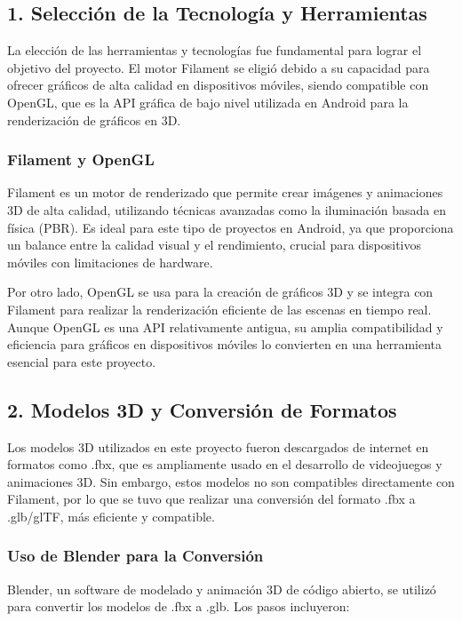 \documentclass[conference]{IEEEtran}
\begin{document}
\subsection{1. Selección de la Tecnología y Herramientas}

La elección de las herramientas y tecnologías fue fundamental para lograr el objetivo del proyecto. El motor Filament \cite{filamentGraphics} se eligió debido a su capacidad para ofrecer gráficos de alta calidad en dispositivos móviles, siendo compatible con OpenGL, que es la API gráfica de bajo nivel utilizada en Android para la renderización de gráficos en 3D.

\subsubsection{Filament y OpenGL}

Filament es un motor de renderizado que permite crear imágenes y animaciones 3D de alta calidad, utilizando técnicas avanzadas como la iluminación basada en física (PBR). Es ideal para este tipo de proyectos en Android, ya que proporciona un balance entre la calidad visual y el rendimiento, crucial para dispositivos móviles con limitaciones de hardware.

Por otro lado, OpenGL se usa para la creación de gráficos 3D y se integra con Filament para realizar la renderización eficiente de las escenas en tiempo real. Aunque OpenGL es una API relativamente antigua, su amplia compatibilidad y eficiencia para gráficos en dispositivos móviles lo convierten en una herramienta esencial para este proyecto.

\subsection{2. Modelos 3D y Conversión de Formatos}

Los modelos 3D utilizados en este proyecto fueron descargados de internet en formatos como .fbx, que es ampliamente usado en el desarrollo de videojuegos y animaciones 3D. Sin embargo, estos modelos no son compatibles directamente con Filament, por lo que se tuvo que realizar una conversión del formato .fbx a .glb/glTF, más eficiente y compatible.

\subsubsection{Uso de Blender para la Conversión}

Blender, un software de modelado y animación 3D de código abierto, se utilizó para convertir los modelos de .fbx a .glb. Los pasos incluyeron:
\end{document}
